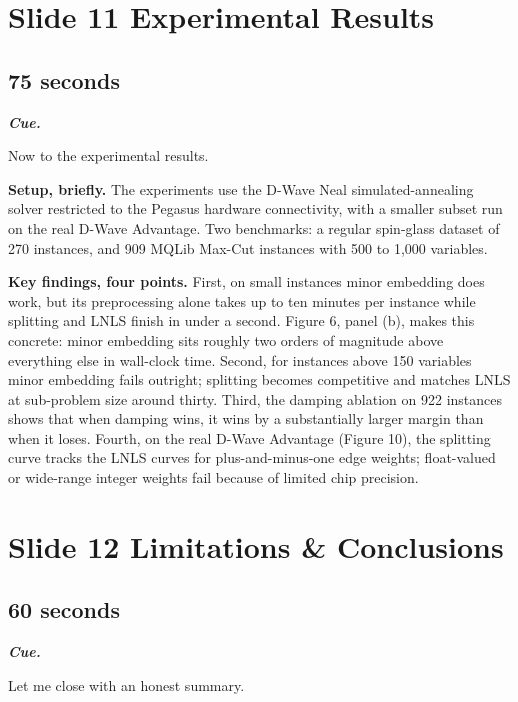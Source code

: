 \documentclass[11pt,a4paper]{article}
\newenvironment{cue}{%
  \par\noindent
  \begin{minipage}{\linewidth}
  \color{muted}\small\itshape
  \textbf{\color{accent}\upshape Cue.}~%
}{%
  \end{minipage}\par\medskip
}
\begin{document}
\section*{Slide 11 \quad Experimental Results}
\subsection*{75 seconds}

\begin{cue}
Now to the experimental results.
\end{cue}

\textbf{Setup, briefly.} The experiments use the D-Wave Neal simulated-annealing solver restricted to the Pegasus hardware connectivity, with a smaller subset run on the real D-Wave Advantage. Two benchmarks: a regular spin-glass dataset of 270 instances, and 909 MQLib Max-Cut instances with 500 to 1{,}000 variables.

\textbf{Key findings, four points.} First, on small instances minor embedding does work, but its preprocessing alone takes up to ten minutes per instance while splitting and LNLS finish in under a second. Figure 6, panel (b), makes this concrete: minor embedding sits roughly two orders of magnitude above everything else in wall-clock time. Second, for instances above 150 variables minor embedding fails outright; splitting becomes competitive and matches LNLS at sub-problem size around thirty. Third, the damping ablation on 922 instances shows that when damping wins, it wins by a substantially larger margin than when it loses. Fourth, on the real D-Wave Advantage (Figure 10), the splitting curve tracks the LNLS curves for plus-and-minus-one edge weights; float-valued or wide-range integer weights fail because of limited chip precision.

\section*{Slide 12 \quad Limitations \& Conclusions}
\subsection*{60 seconds}

\begin{cue}
Let me close with an honest summary.
\end{cue}
\end{document}
